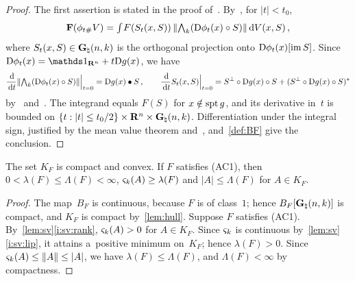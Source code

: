 \documentclass[a4paper,twoside,leqno]{article}
\newcommand{\sv}[1]{\varsigma_{#1}}        %
\begin{document}
\begin{proof}
    The first assertion is stated in the proof of~\cite[Lemma~A.2]{DePhilippis2018}.
    By~\cite[3.2(1)]{Allard1972}, for $|t| < t_0$,
    \begin{displaymath}
        \mathbf{F}(\phi_{t\#} V) = {\textstyle\int_{}^{}} F(S_t(x,S)) \, \|{\textstyle\boldsymbol{\bigwedge}}_{{k}}(\mathrm{D} \phi_t(x)
        \circ S)\| \,\mathrm{d} V(x,S) \,,
    \end{displaymath}
    where $S_t(x,S) \in \mathbf{G}_{\natural}(n,k)$ is the orthogonal projection onto $\mathrm{D} \phi_t(x)[\operatorname{im}
    S]$. Since $\uD \phi_t(x) = \id{\R^{\adim}} + t \uD g(x)$, we have
    \begin{displaymath}
        \frac{\,\mathrm{d}}{\,\mathrm{d} t} \|{\textstyle\boldsymbol{\bigwedge}}_{{k}}(\mathrm{D} \phi_t(x) \circ S)\| \Big|_{t=0} = \mathrm{D} g(x) \bullet
        S \,, \qquad
        \frac{\,\mathrm{d}}{\,\mathrm{d} t} S_t(x,S) \Big|_{t=0} = S^\perp \circ \mathrm{D} g(x) \circ S + (S^\perp
        \circ \mathrm{D} g(x) \circ S)^{*}
    \end{displaymath}
    by~\cite[2.4(1)]{Allard1972} and~\cite[Lemma~A.1]{DePhilippis2018}. The integrand equals
    $F(S)$ for $x \notin \operatorname{spt} g$, and its derivative in~$t$ is bounded on $\{ t : |t| \le t_0/2
    \} \times \mathbf{R}^{n} \times \mathbf{G}_{\natural}(n,k)$. Differentiation under the integral sign,
    justified by the mean value theorem and~\cite[2.4.9]{Federer1969}, and~\ref{def:BF} give the
    conclusion.
\end{proof}

\begin{lemma}
    \label{lem:KF}
    The set $K_F$ is compact and convex. If $F$ satisfies (AC1), then $0 < \lambda(F) \le
    \Lambda(F) < \infty$, $\sv{\vdim}(A) \ge \lambda(F)$ and $|A| \le \Lambda(F)$ for $A \in K_F$.
\end{lemma}

\begin{proof}
    The map~$B_F$ is continuous, because $F$ is of class~$1$; hence $B_F[\mathbf{G}_{\natural}(n,k)]$
    is compact, and $K_F$ is compact by~\ref{lem:hull}. Suppose $F$ satisfies (AC1).
    By~\ref{lem:sv}\ref{i:sv:rank}, $\sv{\vdim}(A) > 0$ for $A \in K_F$. Since $\sv{\vdim}$ is
    continuous by~\ref{lem:sv}\ref{i:sv:lip}, it attains a~positive minimum on~$K_F$; hence
    $\lambda(F) > 0$. Since $\sv{\vdim}(A) \le \|A\| \le |A|$, we have $\lambda(F) \le
    \Lambda(F)$, and $\Lambda(F) < \infty$ by compactness.
\end{proof}
\end{document}
